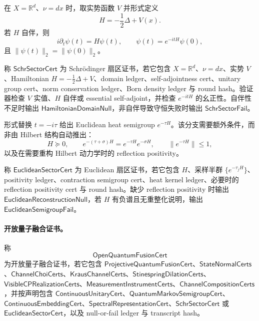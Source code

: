 在 \(X=\mathbb R^d\)、\(\nu=dx\) 时，取实势函数 \(V\) 并形式定义
\[
\boxed{
H=-\frac12\Delta+V(x).
}
\]
若 \(H\) 自伴，则
\[
i\partial_t\psi(t)=H\psi(t),
\qquad
\psi(t)=e^{-itH}\psi(0),
\]
且 \(\|\psi(t)\|_2=\|\psi(0)\|_2\)。

\begin{definition}\label{def:typed-address-biaxial-completion-schr-sector-cert}
称 \(\mathsf{SchrSectorCert}\) 为 Schr\"odinger 扇区证书，若它包含 \(X=\mathbb R^d\)、\(\nu=dx\)、实势 \(V\)、Hamiltonian \(H=-\frac12\Delta+V\)、domain ledger、self-adjointness cert、unitary group cert、norm conservation ledger、Born density ledger 与 round hash。验证器检查 \(V\) 实值、\(H\) 自伴或 essential self-adjoint，并检查 \(e^{-itH}\) 的幺正性。自伴性不足时输出 \(\mathsf{HamiltonianDomainNull}\)，非自伴导致守恒失败时输出 \(\mathsf{SchrSectorFail}\)。
\end{definition}

形式替换 \(t=-i\tau\) 给出 Euclidean heat semigroup \(e^{-\tau H}\)。该分支需要额外条件，而非由 Hilbert 结构自动推出：
\[
H\succeq0,
\qquad
e^{-(\tau+\sigma)H}=e^{-\tau H}e^{-\sigma H},
\qquad
\|e^{-\tau H}\|\le1,
\]
以及在需要重构 Hilbert 动力学时的 reflection positivity。

\begin{definition}\label{def:typed-address-biaxial-completion-euclidean-sector-cert}
称 \(\mathsf{EuclideanSectorCert}\) 为 Euclidean 扇区证书，若它包含 \(H\)、采样半群 \(\{e^{-\tau_jH}\}\)、positivity ledger、contraction semigroup cert、heat kernel ledger、必要时的 reflection positivity cert 与 round hash。缺少 reflection positivity 时输出 \(\mathsf{EuclideanReconstructionNull}\)，若 \(H\) 有负谱且无重整化说明，输出 \(\mathsf{EuclideanSemigroupFail}\)。
\end{definition}

\paragraph{开放量子融合证书。}
\begin{definition}[开放量子融合证书]\label{def:typed-address-biaxial-completion-open-quantum-fusion-cert}
称
\[
\mathsf{OpenQuantumFusionCert}
\]
为开放量子融合证书，若它包含 \(\mathsf{ProjectiveQuantumFusionCert}\)、\(\mathsf{StateNormalCerts}\)、\(\mathsf{ChannelChoiCerts}\)、\(\mathsf{KrausChannelCerts}\)、\(\mathsf{StinespringDilationCerts}\)、\(\mathsf{VisibleCPRealizationCerts}\)、\(\mathsf{MeasurementInstrumentCerts}\)、\(\mathsf{ChannelCompositionCerts}\)，并按声明包含 \(\mathsf{ContinuousUnitaryCert}\)、\(\mathsf{QuantumMarkovSemigroupCert}\)、\(\mathsf{ContinuousEmbeddingCert}\)、\(\mathsf{SpectralRepresentationCert}\)、\(\mathsf{SchrSectorCert}\) 或 \(\mathsf{EuclideanSectorCert}\)，以及 null-or-fail ledger 与 transcript hash。
\end{definition}

